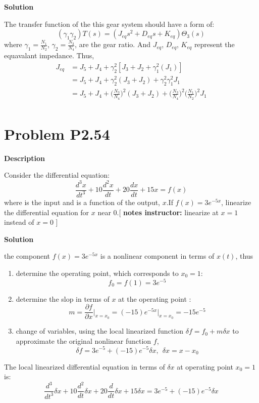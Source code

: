 \documentclass[a4paper]{article}
\begin{document}
 {\par\noindent\bf\large Solution \par}
The transfer function of the this gear system should have a form of:
$$
(\gamma_1 \gamma_2) T(s) = (J_{eq}s^2 + D_{eq}s + K_{eq})\Theta_3(s)
$$
where $\gamma_1 =\frac{N_1}{N_2} $, $\gamma_2 = \frac{N_3}{N_4}$, are the gear ratio. And $J_{eq}$, $D_{eq}$, $K_{eq}$ represent the equavalant impedance. Thus,
$$
\begin{aligned}
J_{eq} &= J_5 + J_4 + \gamma_2^2[J_3 + J_2 + \gamma_1^2(J_1)]\\
       &= J_5 + J_4 + \gamma_2^2(J_3 + J_2) + \gamma_2^2\gamma_1^2J_1\\
       &=J_5 + J_4 + \Big (\frac{N_3}{N_4}\Big )^2(J_3 + J_2) + \Big (\frac{N_3}{N_4}\Big )^2\Big (\frac{N_1}{N_2}\Big )^2J_1\\  
\end{aligned}
$$

\section{Problem P2.54}
{\par\noindent \bf\large  Description   \par}
Consider the differential equation:
$$
\frac{d^3 x}{dt^3} + 10 \frac{d^2 x}{dt} + 20\frac{dx}{dt} + 15x = f(x)
$$
where is the input and is a function of the output, $x$.If $f(x) = 3e^{-5x}$, linearize the differential equation for $x$ near 0.[ {\bf notes instructor:} linearize at $x=1$ instead of $x=0$ ]
{\par\noindent\bf\large Solution \par}
the component $f(x) = 3e^{-5x}$ is a nonlinear component in terms of $x(t)$, thus
\begin{enumerate}
    \item determine the operating point, which corresponds to $x_0 = 1$: 
    $$ f_0 = f(1) = 3e^{-5} $$
    \item determine the slop in terms of $x$ at the operating point :
    $$ m = \frac{\partial f}{\partial x}\Big|_{x = x_0} = (-15)e^{-5x}\Big|_{x = x_0} = -15e^{-5}  $$
    \item change of variables, using the local linearized function $\delta f = f_0 + m\delta x$ to approximate the original nonlinear function $f$,
    $$ \delta f = 3e^{-5} +  (-15)e^{-5}\delta x, \ \  \delta x = x - x_0 $$
\end{enumerate}
The local linearized differential equation in terms of $\delta x$ at operating point $x_0 = 1$ is: 
$$
\frac{d^3}{dt^3}\delta x + 10 \frac{d^2}{dt}\delta x + 20\frac{d}{dt}\delta x + 15\delta x =  3e^{-5} +  (-15)e^{-5}\delta x
$$
\end{document}
